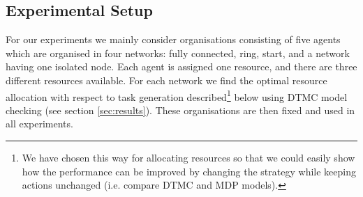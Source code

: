 \documentclass{llncs}
\begin{document}
\subsection{Experimental Setup}
\label{subsec:exp_set}
For our experiments we mainly consider organisations consisting of five agents which are organised in four networks: fully connected, ring, start, and a network having one isolated node. Each agent is assigned one resource, and there are three different resources available. For each network we find the optimal resource allocation with respect to task generation described\footnote{We have chosen this way for allocating resources so that we could easily show how the performance can be improved by changing the strategy while keeping actions unchanged (i.e. compare DTMC and MDP models).} below using DTMC model checking (see section \ref{sec:results}). These organisations are then fixed and used in all experiments.
\end{document}
